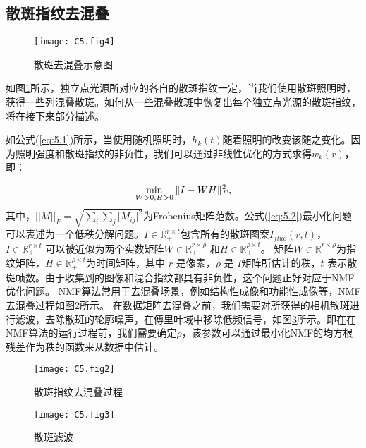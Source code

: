 \subsection{散斑指纹去混叠}

\begin{figure}[htp]
	\centering
	\texttt{[image: C5.fig4]}
	\caption{散斑去混叠示意图}
	\label{fig:5.4}
\end{figure}

如图\ref{fig:5.4}所示，独立点光源所对应的各自的散斑指纹一定，当我们使用散斑照明时，获得一些列混叠散斑。如何从一些混叠散斑中恢复出每个独立点光源的散斑指纹，将在接下来部分描述。

如公式(\ref{eq:5.1})所示，当使用随机照明时，$h_{k}(t)$随着照明的改变该随之变化。因为照明强度和散斑指纹的非负性，我们可以通过非线性优化的方式求得$w_{k}(r)$，即：

\begin{equation}
	\begin{aligned}
\min_{W>0,H>0} \Arrowvert I -WH\Arrowvert_F^{2},
\label{eq:5.2}
\end{aligned}
\end{equation}
其中，$\vert\vert M\vert\vert_F = \sqrt{\sum_i\sum_j \vert M_{ij}\vert^2}$为Frobenius矩阵范数。公式(\ref{eq:5.2})最小化问题可以表述为一个低秩分解问题。$I \in \mathbb{R}_{+}^{r \times t} $包含所有的散斑图案$I_{fluo}(r,t)$，$I \in \mathbb{R}_{+}^{r \times t}$ 可以被近似为两个实数矩阵$W \in \mathbb{R}_{+}^{r \times \rho}$ 和$H \in \mathbb{R}_{+}^{\rho \times t}$。
矩阵$W \in \mathbb{R}_{+}^{r \times \rho}$为指纹矩阵，$H \in \mathbb{R}_{+}^{\rho \times t}$为时间矩阵，其中 $r$ 是像素，$\rho$ 是 $I$矩阵所估计的秩，$t$ 表示散斑帧数。由于收集到的图像和混合指纹都具有非负性，这个问题正好对应于NMF优化问题。
NMF算法常用于去混叠场景，例如结构性成像\cite{boniface_non_invasive_2020}和功能性成像\cite{Moretti2020a,Pegard2016, Pnevmatikakis2016}等，NMF去混叠过程如图\ref{fig:5.2}所示。
在数据矩阵去混叠之前，我们需要对所获得的相机散斑进行滤波，去除散斑的轮廓噪声，在傅里叶域中移除低频信号，如图\ref{fig:5.3}所示。即在在NMF算法的运行过程前，我们需要确定$\rho$，该参数可以通过最小化NMF的均方根残差作为秩的函数来从数据中估计。

\begin{figure}[htp]
	\centering
	\texttt{[image: C5.fig2]}
	\caption{散斑指纹去混叠过程}
	\label{fig:5.2}
\end{figure}

\begin{figure}[htp]
	\centering
	\texttt{[image: C5.fig3]}
	\caption{散斑滤波}
	\label{fig:5.3}
\end{figure}

